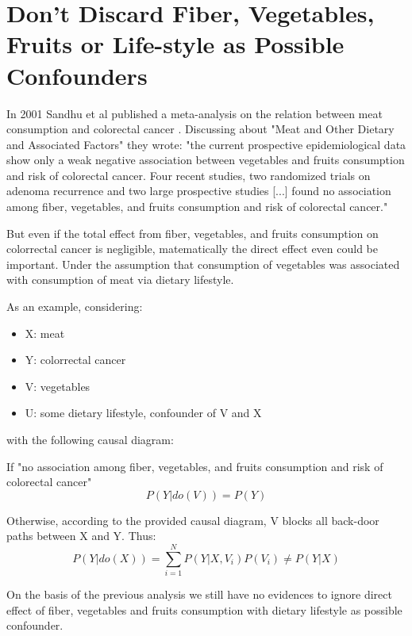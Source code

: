 \documentclass{article}
\begin{document}
\section{Don't Discard Fiber, Vegetables, Fruits or Life-style as Possible Confounders}
\label{sec:sandhu}
In 2001 Sandhu et al published a meta-analysis on the relation between meat consumption and colorectal cancer \cite{sandhu}. Discussing about "Meat and Other Dietary and Associated Factors" they wrote: "the current
prospective epidemiological data show only a weak negative
association between vegetables and fruits consumption and risk
of colorectal cancer. Four recent studies, two randomized
trials on adenoma recurrence and two large prospective
studies [...] found no association
among fiber, vegetables, and fruits consumption and risk of colorectal cancer."

But even if the total effect from fiber, vegetables, and fruits consumption on colorrectal cancer is negligible, matematically the direct effect even could be important. Under the assumption that consumption of vegetables was associated with consumption of meat via dietary lifestyle.

As an example, considering:

\begin{itemize}
\item X: meat
\item Y: colorrectal cancer
\item V: vegetables
\item U: some dietary lifestyle, confounder of V and X
\end{itemize}

with the following causal diagram:


If "no association among fiber, vegetables, and fruits consumption and risk of colorectal cancer"
\begin{equation}
  P(Y|do(V))=P(Y)
\end{equation}

Otherwise, according to the provided causal diagram, V blocks all back-door paths between X and Y. Thus:
\begin{equation}
P(Y|do(X))=\sum _{i=1}^{N} P(Y|X,V_i)P(V_i) \neq P (Y|X)
\end{equation}


On the basis of the previous analysis we still have no evidences to ignore direct effect of fiber, vegetables and fruits consumption with dietary lifestyle as possible confounder.
\end{document}
